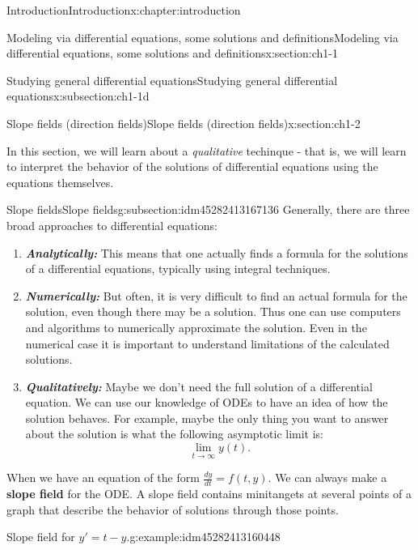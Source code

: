 \documentclass[oneside,10pt,]{book}
\newcommand{\alert}[1]{\textbf{\textit{#1}}}
\newcommand{\terminology}[1]{\textbf{#1}}
\numberwithin{equation}{section}
\numberwithin{equation}{section}
\begin{document}
\begin{chapterptx}{Introduction}{}{Introduction}{}{}{x:chapter:introduction}
\begin{sectionptx}{Modeling via differential equations, some solutions and definitions}{}{Modeling via differential equations, some solutions and definitions}{}{}{x:section:ch1-1}
\begin{subsectionptx}{Studying general differential equations}{}{Studying general differential equations}{}{}{x:subsection:ch1-1d}
\end{subsectionptx}
\end{sectionptx}
%
%
\typeout{************************************************}
\typeout{************************************************}
%
\begin{sectionptx}{Slope fields (direction fields)}{}{Slope fields (direction fields)}{}{}{x:section:ch1-2}
\begin{introduction}{}%
In this section, we will learn about a \emph{qualitative} techinque - that is, we will learn to interpret the behavior of the solutions of differential equations using the equations themselves.%
\end{introduction}%
%
%
\typeout{************************************************}
\typeout{************************************************}
%
\begin{subsectionptx}{Slope fields}{}{Slope fields}{}{}{g:subsection:idm45282413167136}
Generally, there are three broad approaches to differential equations:%
\begin{enumerate}
\item{}\alert{Analytically:} This means that one actually finds a formula for the solutions of a differential equations, typically using integral techniques.%
\item{}\alert{Numerically:} But often, it is very difficult to find an actual formula for the solution, even though there may be a solution. Thus one can use computers and algorithms to numerically approximate the solution. Even in the numerical case it is important to understand limitations of the calculated solutions.%
\item{}\alert{Qualitatively:} Maybe we don't need the full solution of a differential equation. We can use our knowledge of ODEs to have an idea of how the solution behaves. For example, maybe the only thing you want to answer about the solution is what the following asymptotic limit is:%
\begin{equation*}
\lim_{t\to\infty}y(t).
\end{equation*}
%
\end{enumerate}
%
\par
When we have an equation of the form \(\frac{dy}{dt}=f(t,y)\). We can always make a \terminology{slope field} for the ODE. A slope field contains minitangets at several points of a graph that describe the behavior of solutions through those points.%
\begin{example}{Slope field for \(y' = t - y\).}{g:example:idm45282413160448}%

\end{example}
\end{subsectionptx}
\end{sectionptx}
\end{chapterptx}
\end{document}

